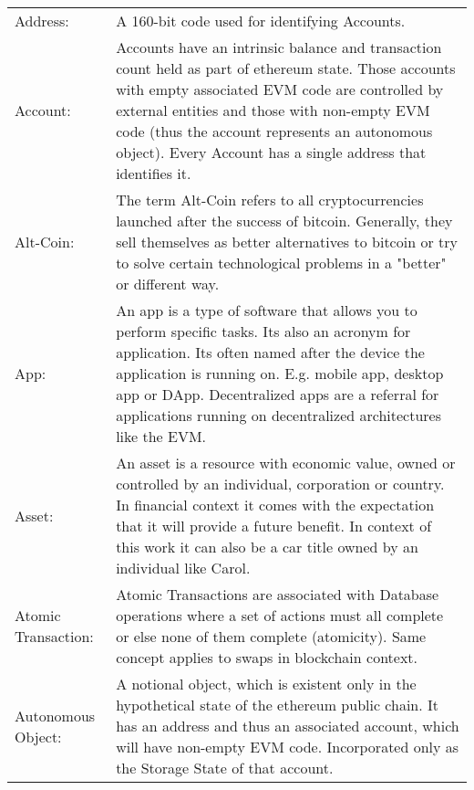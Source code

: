 \begin{center}
	\begin{tabular}{ p{4cm} p{8cm} } 
		Address: & A 160-bit code used for identifying Accounts.  \\ 
		Account: & Accounts have an intrinsic balance and transaction count held as part of ethereum state. Those accounts with empty associated \ac{EVM} code are controlled by external entities and those with non-empty \ac{EVM} code (thus the account represents an autonomous object). Every Account has a single address that identifies it. \\
		Alt-Coin: & The term Alt-Coin refers to all cryptocurrencies launched after the success of bitcoin. Generally, they sell themselves as better alternatives to bitcoin or try to solve certain technological problems in a "better" or different way. \\
		App: & An app is a type of software that allows you to perform specific tasks. Its also an acronym for application. Its often named after the device the application is running on. E.g. mobile app, desktop app or \ac{DApp}. Decentralized apps are a referral for applications running on decentralized architectures like the \ac{EVM}. \\
		Asset: & An asset is a resource with economic value, owned or controlled by an individual, corporation or country. In financial context it comes with the expectation that it will provide a future benefit. In context of this work it can also be a car title owned by an individual like Carol.\\
		Atomic Transaction: & Atomic Transactions are associated with Database operations where a set of actions must all complete or else none of them complete (atomicity). Same concept applies to swaps in blockchain context. \\
		Autonomous Object: & A notional object, which is existent only in the hypothetical state of the ethereum public chain. It has an address and thus an associated account, which will have non-empty \ac{EVM} code. Incorporated only as the Storage State of that account. \\
	\end{tabular}
\end{center}


\clearpage

